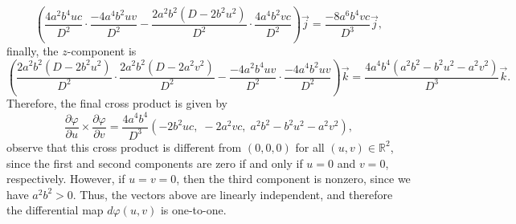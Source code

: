 \documentclass{amsart}
\theoremstyle{plain}
\numberwithin{equation}{section}
\begin{document}
$$
\left( \frac{4a^2b^4uc}{D^2} \cdot \frac{-4a^4b^2uv}{D^2} - \frac{2a^2b^2(D - 2b^2u^2)}{D^2} \cdot \frac{4a^4b^2vc}{D^2} \right)\vec{j} = \frac{-8a^6b^4vc}{D^3}\vec{j},
$$
finally, the \( z \)-component is
$$
\left( \frac{2a^2b^2(D - 2b^2u^2)}{D^2} \cdot \frac{2a^2b^2(D - 2a^2v^2)}{D^2} - \frac{-4a^2b^4uv}{D^2} \cdot \frac{-4a^4b^2uv}{D^2} \right)\vec{k} = \frac{4a^4b^4(a^2b^2 - b^2u^2 - a^2v^2)}{D^3}\vec{k}.
$$
Therefore, the final cross product is given by
$$
\frac{\partial \varphi}{\partial u} \times \frac{\partial \varphi}{\partial v} = \frac{4a^4b^4}{D^3} \left( -2b^2uc,\; -2a^2vc,\; a^2b^2 - b^2u^2 - a^2v^2 \right),
$$
observe that this cross product is different from \( (0,0,0) \) for all \( (u,v) \in \mathbb{R}^2 \), since the first and second components are zero if and only if \( u = 0 \) and \( v = 0 \), respectively. However, if \( u = v = 0 \), then the third component is nonzero, since we have \( a^2b^2 > 0 \). Thus, the vectors above are linearly independent, and therefore the differential map \( d\varphi(u,v) \) is one-to-one.
\end{document}
